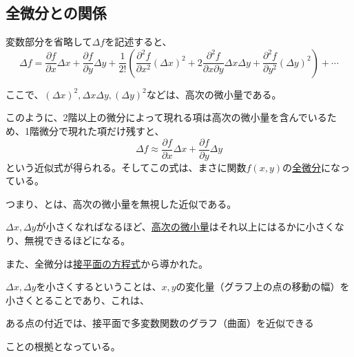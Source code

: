 \documentclass[../../../topic_calculus]{subfiles}
\begin{document}
\subsection{全微分との関係}

変数部分を省略して$\Delta f$を記述すると、
\begin{equation*}
  \Delta f = \frac{\partial f}{\partial x}\Delta x + \frac{\partial f}{\partial y}\Delta y + \frac{1}{2!}\left(\frac{\partial^2 f}{\partial x^2}(\Delta x)^2 + 2\frac{\partial^2 f}{\partial x \partial y}\Delta x \Delta y + \frac{\partial^2 f}{\partial y^2}(\Delta y)^2\right) + \cdots
\end{equation*}

ここで、$(\Delta x)^2, \Delta x \Delta y, (\Delta y)^2$などは、高次の微小量である。

\br

このように、2階以上の微分によって現れる項は高次の微小量を含んでいるため、1階微分で現れた項だけ残すと、
\begin{equation*}
  \Delta f \approx \frac{\partial f}{\partial x}\Delta x + \frac{\partial f}{\partial y}\Delta y
\end{equation*}
という近似式が得られる。そしてこの式は、まさに関数$f(x,y)$の\hyperref[sec:total-derivative]{全微分}になっている。

\br

つまり、とは、高次の微小量を無視した近似である。

$\Delta x, \Delta y$が小さくなればなるほど、\hyperref[sec:diff-higher-infinitesimals]{高次の微小量}はそれ以上にはるかに小さくなり、無視できるほどになる。

\br

また、全微分は\hyperref[thm:tangent-plane-equation]{接平面の方程式}から導かれた。

$\Delta x, \Delta y$を小さくするということは、$x,y$の変化量（グラフ上の点の移動の幅）を小さくとることであり、これは、
\begin{emphabox}
  \begin{spacebox}
    \begin{center}
      ある点の付近では、接平面で多変数関数のグラフ（曲面）を近似できる
    \end{center}
  \end{spacebox}
\end{emphabox}
ことの根拠となっている。
\end{document}
